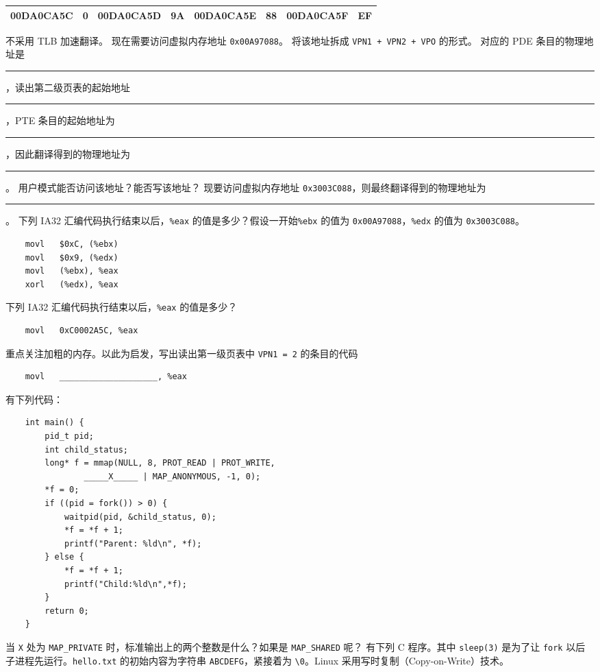\begin{problems}
\begin{table}[H]
\begin{tabular}{|c|c|c|c|c|c|c|c|}
                00DA0CA5C & 0 & 00DA0CA5D & 9A & 00DA0CA5E & 88 & 00DA0CA5F & EF \\ \hline
            \end{tabular}
        \end{table}
        不采用 TLB 加速翻译。
        \qn 现在需要访问虚拟内存地址 \verb|0x00A97088|。
            \subqn 将该地址拆成 \verb|VPN1 + VPN2 + VPO| 的形式。
            \subqn 对应的 PDE 条目的物理地址是 \rule{2.5cm}{0.25mm}，读出第二级页表的起始地址 \rule{2.5cm}{0.25mm}，PTE 条目的起始地址为 \rule{2.5cm}{0.25mm}，因此翻译得到的物理地址为 \rule{2.5cm}{0.25mm}。
            \subqn 用户模式能否访问该地址？能否写该地址？
        \qn 现要访问虚拟内存地址 \verb|0x3003C088|，则最终翻译得到的物理地址为 \rule{2.5cm}{0.25mm}。
        \qn 下列 IA32 汇编代码执行结束以后，\verb|%eax| 的值是多少？假设一开始\verb|%ebx| 的值为 \verb|0x00A97088|，\verb|%edx| 的值为 \verb|0x3003C088|。
        \begin{verbatim}
    movl   $0xC, (%ebx)
    movl   $0x9, (%edx)
    movl   (%ebx), %eax
    xorl   (%edx), %eax
        \end{verbatim}
        \qn 下列 IA32 汇编代码执行结束以后，\verb|%eax| 的值是多少？
        \begin{verbatim}
    movl   0xC0002A5C, %eax
        \end{verbatim}
        重点关注加粗的内存。以此为启发，写出读出第一级页表中 \verb|VPN1 = 2| 的条目的代码
        \begin{verbatim}
    movl   ____________________, %eax
        \end{verbatim}
        \pro 有下列代码：
        \begin{verbatim}
    int main() {
        pid_t pid;
        int child_status;
        long* f = mmap(NULL, 8, PROT_READ | PROT_WRITE,
                _____X_____ | MAP_ANONYMOUS, -1, 0);
        *f = 0;
        if ((pid = fork()) > 0) {
            waitpid(pid, &child_status, 0);
            *f = *f + 1;
            printf("Parent: %ld\n", *f);
        } else {
            *f = *f + 1;
            printf("Child:%ld\n",*f);
        } 
        return 0;
    }
        \end{verbatim}
        当 \verb|X| 处为 \verb|MAP_PRIVATE| 时，标准输出上的两个整数是什么？如果是 \verb|MAP_SHARED| 呢？
        \pro 有下列 C 程序。其中 \verb|sleep(3)| 是为了让 \verb|fork| 以后子进程先运行。\verb|hello.txt| 的初始内容为字符串 \verb|ABCDEFG|，紧接着为 \verb|\0|。Linux 采用写时复制（Copy-on-Write）技术。

\end{problems}
